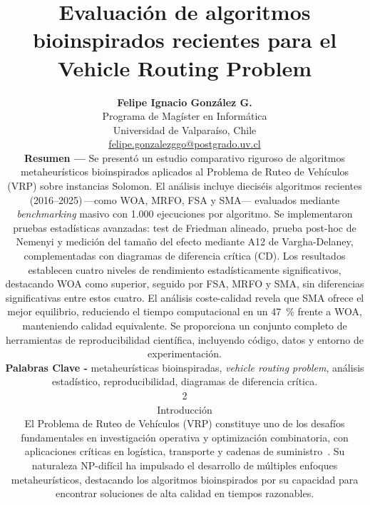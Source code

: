\documentclass[10pt,a4paper]{extarticle}
\begin{document}
\title{Evaluación de algoritmos bioinspirados recientes para el Vehicle Routing Problem}
\author{%
  \begin{tabular}{c}
    \textbf{Felipe Ignacio González G.}\\
    Programa de Magíster en Informática\\
    Universidad de Valparaíso, Chile\\
    \href{mailto:felipe.gonzalezggo@postgrado.uv.cl}{felipe.gonzalezggo@postgrado.uv.cl}
  \end{tabular}
\date{}
\maketitle

{\small
\noindent\textbf{Resumen ---} Se presentó un estudio comparativo riguroso de algoritmos metaheurísticos bioinspirados aplicados al Problema de Ruteo de Vehículos (VRP) sobre instancias Solomon. El análisis incluye dieciséis algoritmos recientes (2016--2025)\,—como WOA, MRFO, FSA y SMA— evaluados mediante \textit{benchmarking} masivo con 1.000 ejecuciones por algoritmo. Se implementaron pruebas estadísticas avanzadas: test de Friedman alineado, prueba post-hoc de Nemenyi y medición del tamaño del efecto mediante A12 de Vargha-Delaney, complementadas con diagramas de diferencia crítica (CD). Los resultados establecen cuatro niveles de rendimiento estadísticamente significativos, destacando WOA como superior, seguido por FSA, MRFO y SMA, sin diferencias significativas entre estos cuatro. El análisis coste-calidad revela que SMA ofrece el mejor equilibrio, reduciendo el tiempo computacional en un 47~\% frente a WOA, manteniendo calidad equivalente. Se proporciona un conjunto completo de herramientas de reproducibilidad científica, incluyendo código, datos y entorno de experimentación.

\noindent\textbf{Palabras Clave -} metaheurísticas bioinspiradas, \textit{vehicle routing problem}, análisis estadístico, reproducibilidad, diagramas de diferencia crítica.
}

\vspace{1em}
\begin{multicols}{2}

\section{Introducción}
El Problema de Ruteo de Vehículos (VRP) constituye uno de los desafíos fundamentales en investigación operativa y optimización combinatoria, con aplicaciones críticas en logística, transporte y cadenas de suministro~\cite{Mirjalili2016WOA}. Su naturaleza NP-difícil ha impulsado el desarrollo de múltiples enfoques metaheurísticos, destacando los algoritmos bioinspirados por su capacidad para encontrar soluciones de alta calidad en tiempos razonables.


\end{multicols}}
\end{document}
